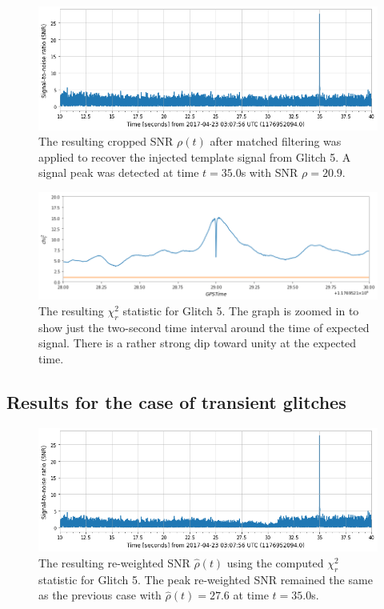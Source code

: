 \documentclass[preprint,
letterpaper,
 amsmath,amssymb,
 aps,
]{revtex4-2}
\begin{document}
\begin{widetext}

\begin{figure}[t]
\includegraphics[width = .9\textwidth]{glitch 5 template 1.png}
\caption{The resulting cropped SNR $\rho(t)$ after matched filtering was applied to recover the injected template signal from Glitch 5. A signal peak was detected at time $t = 35.0$s with SNR $\rho = 20.9$.}
\centering
\end{figure}

\begin{figure}
\includegraphics[width = .9\textwidth]{chi2 glitch 5.png}
\caption{The resulting $\chi^2_r$ statistic for Glitch 5. The graph is zoomed in to show just the two-second time interval around the time of expected signal. There is a rather strong dip toward unity at the expected time.}
\centering
\end{figure} 

\end{widetext}


\subsection{Results for the case of transient glitches}

\begin{figure}[t]
\includegraphics[width = .9\textwidth]{reweighted glitch 5.png}
\caption{The resulting re-weighted SNR $\hat{\rho}(t)$ using the computed $\chi^2_r$ statistic for Glitch 5. The peak re-weighted SNR remained the same as the previous case with $\hat{\rho}(t)=27.6$ at time $t=35.0$s.}
\centering
\end{figure}
\end{document}
